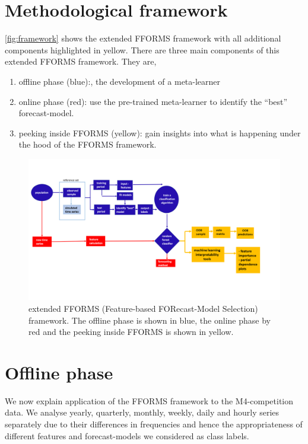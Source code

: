 \documentclass[11pt,a4paper,]{article}
\providecommand{\tightlist}{%
  \setlength{\itemsep}{0pt}\setlength{\parskip}{0pt}}
\begin{document}
\hypertarget{fforms}{%
\section{Methodological framework}\label{fforms}}

\autoref{fig:framework} shows the extended FFORMS framework with all additional components highlighted in yellow. There are three main components of this extended FFORMS framework. They are,

\begin{enumerate}
\def\labelenumi{\arabic{enumi}.}
\tightlist
\item
  offline phase (blue):, the development of a meta-learner
\item
  online phase (red): use the pre-trained meta-learner to identify the ``best'' forecast-model.
\item
  peeking inside FFORMS (yellow): gain insights into what is happening under the hood of the FFORMS framework.
\end{enumerate}

\begin{figure}[h]
\includegraphics[width=1.15\linewidth]{img/framework2} \caption{extended FFORMS (Feature-based FORecast-Model Selection) framework. The offline phase is shown in blue, the online phase by red and the peeking inside FFORMS is shown in yellow.}\label{fig:framework}
\end{figure}

\hypertarget{offline}{%
\section{Offline phase}\label{offline}}

We now explain application of the FFORMS framework to the M4-competition data. We analyse yearly, quarterly, monthly, weekly, daily and hourly series separately due to their differences in frequencies and hence the appropriateness of different features and forecast-models we considered as class labels.
\end{document}
